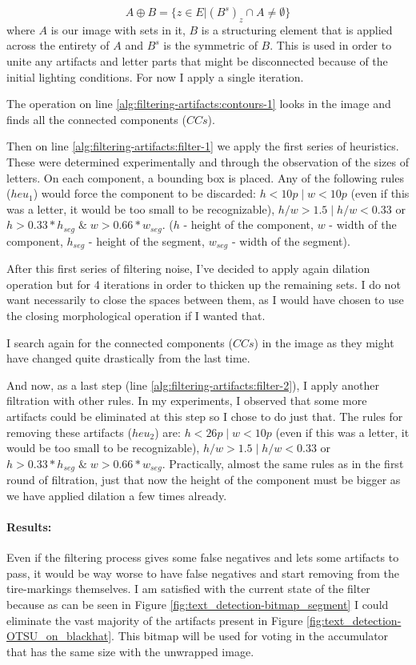 \[A \oplus B = \{z \in E | (B^s)_z \cap A \neq \emptyset \} \]
where $A$ is our image with sets in it, $B$ is a structuring element that is applied across the entirety of $A$ and $B^s$ is the symmetric of $B$. This is used in order to unite any artifacts and letter parts that might be disconnected because of the initial lighting conditions. For now I apply a single iteration.

The operation on line \ref{alg:filtering-artifacts:contours-1} looks in the image and finds all the connected components ($CCs$).

Then on line \ref{alg:filtering-artifacts:filter-1} we apply the first series of heuristics. These were determined experimentally and through the observation of the sizes of letters. On each component, a bounding box is placed. Any of the following rules ($heu_1$\label{filtering:heuristics-1}) would force the component to be discarded: $h < 10p \;|\; w < 10p$ (even if this was a letter, it would be too small to be recognizable), $h/w > 1.5 \;|\; h/w < 0.33$ or $h > 0.33*h_{seg} \;\&\; w > 0.66*w_{seg}$. ($h$ - height of the component, $w$ - width of the component, $h_{seg}$ - height of the segment, $w_{seg}$ - width of the segment).

After this first series of filtering noise, I've decided to apply again dilation operation but for 4 iterations in order to thicken up the remaining sets. I do not want necessarily to close the spaces between them, as I would have chosen to use the closing morphological operation if I wanted that.

I search again for the connected components ($CCs$) in the image as they might have changed quite drastically from the last time.

And now, as a last step (line \ref{alg:filtering-artifacts:filter-2}), I apply another filtration with other rules. In my experiments, I observed that some more artifacts could be eliminated at this step so I chose to do just that. The rules for removing these artifacts ($heu_2$\label{filtering:heuristics-2}) are:  $h < 26p \;|\; w < 10p$ (even if this was a letter, it would be too small to be recognizable), $h/w > 1.5 \;|\; h/w < 0.33$ or $h > 0.33*h_{seg} \;\&\; w > 0.66*w_{seg}$. Practically, almost the same rules as in the first round of filtration, just that now the height of the component must be bigger as we have applied dilation a few times already.

\paragraph*{Results:}\mbox{}\par
Even if the filtering process gives some false negatives and lets some artifacts to pass, it would be way worse to have false negatives and start removing from the tire-markings themselves. I am satisfied with the current state of the filter because as can be seen in Figure \ref{fig:text_detection-bitmap_segment} I could eliminate the vast majority of the artifacts present in Figure \ref{fig:text_detection-OTSU_on_blackhat}. This bitmap will be used for voting in the accumulator that has the same size with the unwrapped image.

